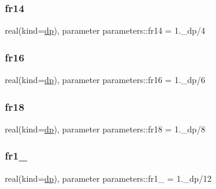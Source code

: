 \mbox{\label{group__FRACTIONS_gaffec0a7933c65703944576ebea0c1cd1}} 
\subsubsection{\texorpdfstring{fr14}{fr14}}
{\footnotesize\ttfamily real(kind=\mbox{\hyperlink{namespaceparameters_a52f8c6351fd79345d8811e065bcbbb37}{dp}}), parameter parameters\+::fr14 = 1.\+\_\+dp/4}

\mbox{\label{group__FRACTIONS_ga67d2b3b04777af92b519826b97ce69a4}} 
\subsubsection{\texorpdfstring{fr16}{fr16}}
{\footnotesize\ttfamily real(kind=\mbox{\hyperlink{namespaceparameters_a52f8c6351fd79345d8811e065bcbbb37}{dp}}), parameter parameters\+::fr16 = 1.\+\_\+dp/6}

\mbox{\label{group__FRACTIONS_ga59c72e10a23b892113d106b25c1f60d7}} 
\subsubsection{\texorpdfstring{fr18}{fr18}}
{\footnotesize\ttfamily real(kind=\mbox{\hyperlink{namespaceparameters_a52f8c6351fd79345d8811e065bcbbb37}{dp}}), parameter parameters\+::fr18 = 1.\+\_\+dp/8}

\mbox{\label{group__FRACTIONS_gaa8dad9cec662853b1633da29ad89f6aa}} 
\subsubsection{\texorpdfstring{fr1\+\_}{fr1\_12}}
{\footnotesize\ttfamily real(kind=\mbox{\hyperlink{namespaceparameters_a52f8c6351fd79345d8811e065bcbbb37}{dp}}), parameter parameters\+::fr1\+\_ = 1.\+\_\+dp/12}

